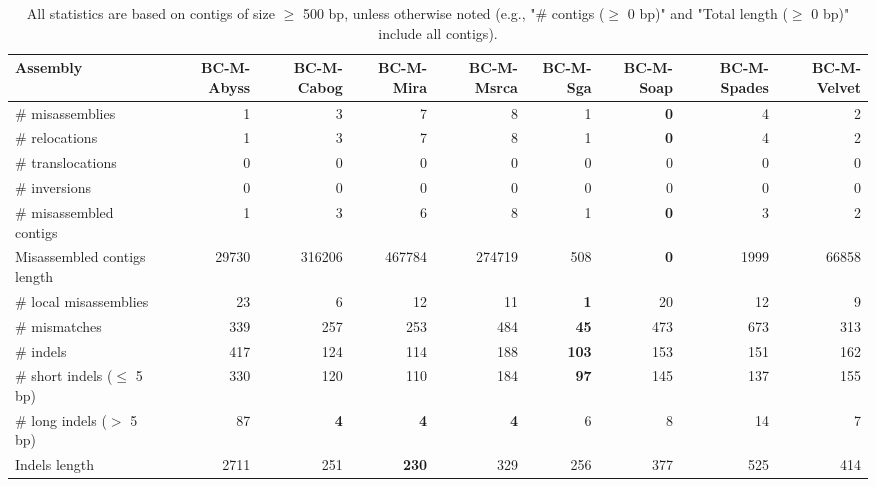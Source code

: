 \documentclass[12pt,a4paper]{article}
\begin{document}
\begin{table}[ht]
\begin{center}
\caption{All statistics are based on contigs of size $\geq$ 500 bp, unless otherwise noted (e.g., "\# contigs ($\geq$ 0 bp)" and "Total length ($\geq$ 0 bp)" include all contigs).}
\begin{tabular}{|l*{8}{|r}|}
\hline
Assembly & BC-M-Abyss & BC-M-Cabog & BC-M-Mira & BC-M-Msrca & BC-M-Sga & BC-M-Soap & BC-M-Spades & BC-M-Velvet \\ \hline
\# misassemblies & 1 & 3 & 7 & 8 & 1 & {\bf 0} & 4 & 2 \\ \hline
\hspace{5mm}\# relocations & 1 & 3 & 7 & 8 & 1 & {\bf 0} & 4 & 2 \\ \hline
\hspace{5mm}\# translocations & 0 & 0 & 0 & 0 & 0 & 0 & 0 & 0 \\ \hline
\hspace{5mm}\# inversions & 0 & 0 & 0 & 0 & 0 & 0 & 0 & 0 \\ \hline
\# misassembled contigs & 1 & 3 & 6 & 8 & 1 & {\bf 0} & 3 & 2 \\ \hline
Misassembled contigs length & 29730 & 316206 & 467784 & 274719 & 508 & {\bf 0} & 1999 & 66858 \\ \hline
\# local misassemblies & 23 & 6 & 12 & 11 & {\bf 1} & 20 & 12 & 9 \\ \hline
\# mismatches & 339 & 257 & 253 & 484 & {\bf 45} & 473 & 673 & 313 \\ \hline
\# indels & 417 & 124 & 114 & 188 & {\bf 103} & 153 & 151 & 162 \\ \hline
\hspace{5mm}\# short indels ($\leq$ 5 bp) & 330 & 120 & 110 & 184 & {\bf 97} & 145 & 137 & 155 \\ \hline
\hspace{5mm}\# long indels ($>$ 5 bp) & 87 & {\bf 4} & {\bf 4} & {\bf 4} & 6 & 8 & 14 & 7 \\ \hline
Indels length & 2711 & 251 & {\bf 230} & 329 & 256 & 377 & 525 & 414 \\ \hline
\end{tabular}
\end{center}
\end{table}
\end{document}
